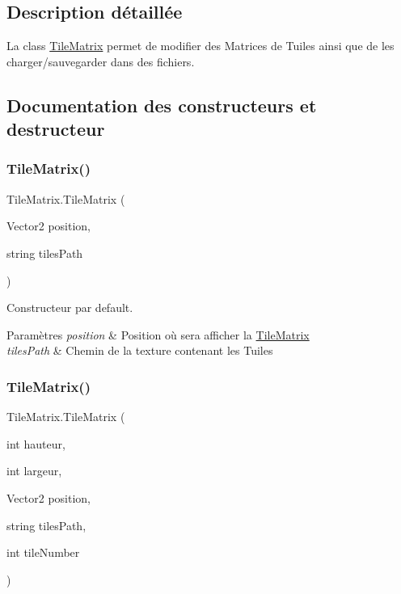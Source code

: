 \subsection{Description détaillée}
La class \hyperlink{class_tile_matrix}{Tile\+Matrix} permet de modifier des Matrices de Tuiles ainsi que de les charger/sauvegarder dans des fichiers. 



\subsection{Documentation des constructeurs et destructeur}
\mbox{\label{class_tile_matrix_a2fd594060764e898a105c2452d75f46f}} 
\subsubsection{\texorpdfstring{Tile\+Matrix()}{TileMatrix()}\hspace{0.1cm}{\footnotesize\ttfamily [1/3]}}
{\footnotesize\ttfamily Tile\+Matrix.\+Tile\+Matrix (\begin{DoxyParamCaption}\item[{Vector2}]{position,  }\item[{string}]{tiles\+Path }\end{DoxyParamCaption})}



Constructeur par default. 


\begin{DoxyParams}{Paramètres}
{\em position} & Position où sera afficher la \hyperlink{class_tile_matrix}{Tile\+Matrix} \\
\hline
{\em tiles\+Path} & Chemin de la texture contenant les Tuiles \\
\hline
\end{DoxyParams}
\mbox{\label{class_tile_matrix_a64f9596f9d73b577fbd3d1df5ee412a8}} 
\subsubsection{\texorpdfstring{Tile\+Matrix()}{TileMatrix()}\hspace{0.1cm}{\footnotesize\ttfamily [2/3]}}
{\footnotesize\ttfamily Tile\+Matrix.\+Tile\+Matrix (\begin{DoxyParamCaption}\item[{int}]{hauteur,  }\item[{int}]{largeur,  }\item[{Vector2}]{position,  }\item[{string}]{tiles\+Path,  }\item[{int}]{tile\+Number }\end{DoxyParamCaption})}



